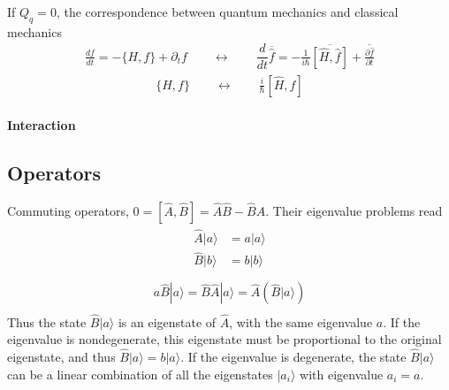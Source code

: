 \documentclass[letterpaper,10pt,english]{jupyterBook}
\begin{document}
\sphinxAtStartPar
If \(Q_q = 0\), the correspondence between quantum mechanics and classical mechanics
\begin{equation*}
\begin{split}\frac{d f}{d t} = - \{ H, f \} + \partial_t f \qquad \leftrightarrow \qquad \dfrac{d}{dt} \overline{\hat{f}} = - \frac{1}{i \hbar} \overline{ [ \hat{H}, \hat{f} ]} + \overline{\frac{\partial \hat{f}}{\partial t}}\end{split}
\end{equation*}\begin{equation*}
\begin{split}\{ H, f \} \qquad \leftrightarrow \qquad \frac{i}{\hbar}[\hat{H}, \hat{f}]\end{split}
\end{equation*}

\paragraph{Interaction}
\label{\detokenize{ch/quantum-mechanics/intro:interaction}}\label{\detokenize{ch/quantum-mechanics/intro:quantum-mechanics-intro-non-relativistic-schrodinger-equation-pictures-interaction}}

\subsection{Operators}
\label{\detokenize{ch/quantum-mechanics/intro:operators}}
\sphinxAtStartPar
Commuting operators, \(0 = [ \hat{A}, \hat{B} ] = \hat{A} \hat{B} - \hat{B} \hat{A}\). Their eigenvalue problems read
\begin{equation*}
\begin{split}\begin{aligned}
  \hat{A} | a \rangle & = a | a \rangle \\
  \hat{B} | b \rangle & = b | b \rangle \\
\end{aligned}\end{split}
\end{equation*}\begin{equation*}
\begin{split}
  a \hat{B} | a \rangle = \hat{B} \hat{A} | a \rangle = \hat{A} \left( \hat{B} | a \rangle \right) \\
\end{split}
\end{equation*}
\sphinxAtStartPar
Thus the state \(\hat{B} | a \rangle\) is an eigenstate of \(\hat{A}\), with the same eigenvalue \(a\). If the eigenvalue is non\sphinxhyphen{}degenerate, this eigenstate must be proportional to the original eigenstate, and thus \(\hat{B} | a \rangle = b | a \rangle\). If the eigenvalue is degenerate, the state \(\hat{B} | a \rangle\) can be a linear combination of all the eigenstates \(| a_i \rangle\) with eigenvalue \(a_i = a\).
\end{document}
